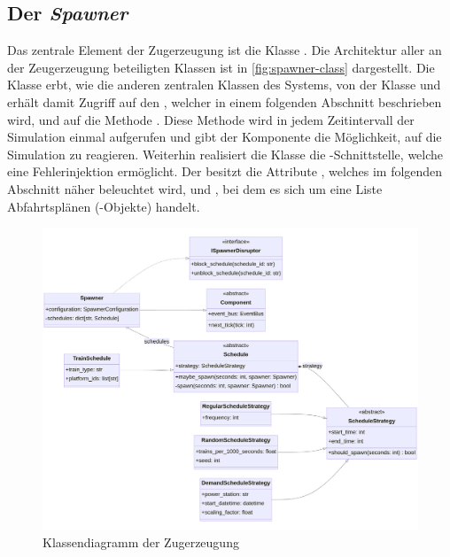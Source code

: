 \subsection{Der \emph{Spawner}}

Das zentrale Element der Zugerzeugung ist die Klasse . Die Architektur aller an der Zeugerzeugung beteiligten Klassen ist in \autoref{fig:spawner-class} dargestellt. Die Klasse  erbt, wie die anderen zentralen Klassen des Systems, von der Klasse  und erhält damit Zugriff auf den , welcher in einem folgenden Abschnitt beschrieben wird, und auf die Methode . Diese Methode wird in jedem Zeitintervall der Simulation einmal aufgerufen und gibt der Komponente die Möglichkeit, auf die Simulation zu reagieren. Weiterhin realisiert die Klasse  die -Schnittstelle, welche eine Fehlerinjektion\cite{persitzky_fehlerinjektion_2023} ermöglicht. Der  besitzt die Attribute , welches im folgenden Abschnitt näher beleuchtet wird, und , bei dem es sich um eine Liste Abfahrtsplänen (-Objekte) handelt.

\begin{figure}[!ht]
	\centering
	\includegraphics[width=1.0\linewidth]{images/diagrams/spawner-class.png}
	\caption{Klassendiagramm der Zugerzeugung}
	\label{fig:spawner-class}
\end{figure}


